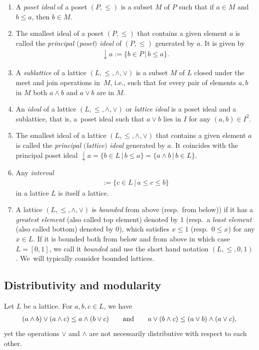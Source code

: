 \documentclass[10pt,a4paper]{amsart}
\numberwithin{equation}{section}
\begin{document}
\begin{Definition} \label{de:latticenotion}\qquad\samepage
\begin{enumerate}\itemsep=0pt
\item[$(a)$]
A {\it poset ideal} of a poset $(P,\leq)$ is a subset $M$ of $P$ such that if $a\in M$ and $b\leq a$, then $b\in M$. 	
\item[$(b)$] The smallest ideal of a poset $(P,\leq)$ that contains a given element $a$ is called the {\it principal $($poset$)$ ideal} of $(P,\leq)$ generated by $a$. It is given by
	\begin{gather*}%
\downarrow a:=\{b\in P\,|\, b\leq a\}.
	\end{gather*}
\item[$(c)$]
	A {\it sublattice} of a lattice $(L,\leq, \wedge,\vee)$ is
a subset $M$ of $ L$ closed under the meet and join operations in~$M$, i.e., such that for every pair of elements $a, b$ in $M$ both $a \wedge b$ and $a\vee b$ are in $M$.
\item[$(d)$]
An {\it ideal} of a lattice $(L, \leq,\wedge,\vee)$ or {\it lattice ideal} is a poset ideal and a sublattice, that is, a~poset ideal such that $a\vee b$ lies in $I$ for any $(a, b)\in I^2$.
\item[$(e)$]
The smallest ideal of a lattice $(L, \leq,\wedge,\vee)$ that contains a given element $a$ is called the {\it principal $($lattice$)$ ideal} generated by $a$. It coincides with the principal poset ideal $\downarrow a=\{b\in L\,|\, b\leq a\}=\{a\wedge b\,|\, b\in L \}$.
\item[$(f)$]
Any {\it interval}
\begin{gather*}
[a, b]:=\{c\in L\,|\, a\leq c\leq b \}
\end{gather*} in a lattice $L$ is itself a lattice.
\item[$(g)$]
	A lattice $(L,\leq,\wedge, \vee)$ is {\it bounded} from above (resp.~from below)) if it has a {\it greatest element} (also called top element)
	denoted by $1$ (resp.~a {\it least element} (also called bottom) denoted by $0$), which satisfies $ x\leq 1$ (resp.~$0\leq x$) for any $x\in L$.
	If it is bounded both from below and from above in which case $L=[0, 1]$, we call it {\it bounded} and use the short hand notation $(L, \leq, 0, 1)$. We~will typically consider bounded lattices.
\end{enumerate}
\end{Definition}

\subsection{Distributivity and modularity}
 Let $L$ be a lattice. For $a, b, c\in L$, we have
 \begin{gather*}%
 (a\wedge b)\vee (a\wedge c)\leq a\wedge (b\vee c) \qquad {\rm and}\qquad a\vee (b\wedge c)\leq (a\vee b)\wedge(a\vee c),
 \end{gather*}
 yet the operations $\vee$ and $\wedge$ are not necessarily distributive with respect to each other.
\end{document}
